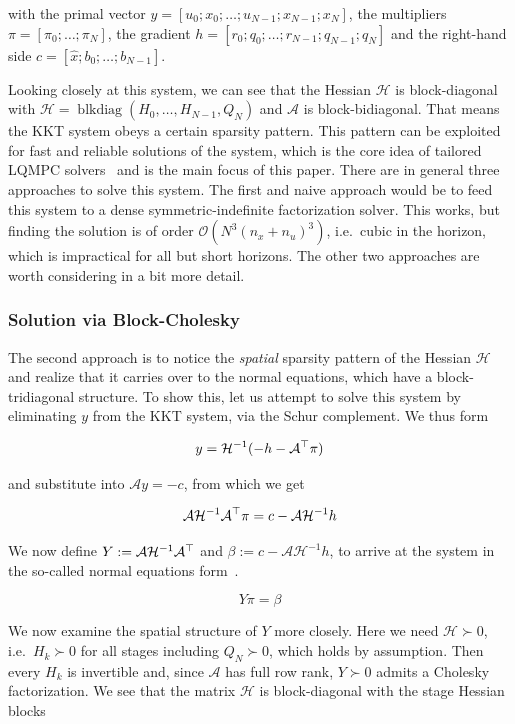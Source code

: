 with the primal vector $y = [u_0; x_0; \dots; u_{N-1}; x_{N-1}; x_N]$, the multipliers $\pi = [\pi_0; \dots; \pi_N]$, the gradient $h = [r_0; q_0; \dots; r_{N-1}; q_{N-1}; q_N]$ and the right-hand side $c = [\hat{x}; b_0; \dots; b_{N-1}]$.

Looking closely at this system, we can see that the Hessian $\mathcal{H}$ is block-diagonal with $\mathcal{H} = \operatorname{blkdiag}(H_0, \dots, H_{N-1}, Q_N)$ and $\mathcal{A}$ is block-bidiagonal.
That means the KKT system obeys a certain sparsity pattern.
This pattern can be exploited for fast and reliable solutions of the system, which is the core idea of tailored LQMPC solvers~\cite{wang2009fast,frison2020hpipm} and is the main focus of this paper.
There are in general three approaches to solve this system.
The first and naive approach would be to feed this system to a dense symmetric-indefinite factorization solver.
This works, but finding the solution is of order $\mathcal{O}\!\left(N^3 (n_x + n_u)^3\right)$, i.e.\ cubic in the horizon, which is impractical for all but short horizons.
The other two approaches are worth considering in a bit more detail.

\subsubsection{Solution via Block-Cholesky}

The second approach is to notice the \textit{spatial} sparsity pattern of the Hessian $\mathcal{H}$ and realize that it carries over to the normal equations, which have a block-tridiagonal structure.
To show this, let us attempt to solve this system by eliminating $y$ from the KKT system, via the Schur complement.
We thus form

\[
y = \mathcal{H}^{-1}(-h - \mathcal{A}^\top \pi)
\]

and substitute into $\mathcal{A}y = -c$, from which we get

\[
\mathcal{A} \mathcal{H}^{-1} \mathcal{A}^\top \pi = c - \mathcal{A} \mathcal{H}^{-1} h
\]

We now define $Y := \mathcal{A} \mathcal{H}^{-1} \mathcal{A}^\top$ and $\beta := c - \mathcal{A} \mathcal{H}^{-1} h$, to arrive at the system in the so-called normal equations form~\cite{wang2009fast}.

\[
    Y \pi = \beta
\]

We now examine the spatial structure of $Y$ more closely.
Here we need $\mathcal{H} \succ 0$, i.e.\ $H_k \succ 0$ for all stages including $Q_N \succ 0$, which holds by assumption.
Then every $H_k$ is invertible and, since $\mathcal{A}$ has full row rank, $Y \succ 0$ admits a Cholesky factorization.
We see that the matrix $\mathcal{H}$ is block-diagonal with the stage Hessian blocks

